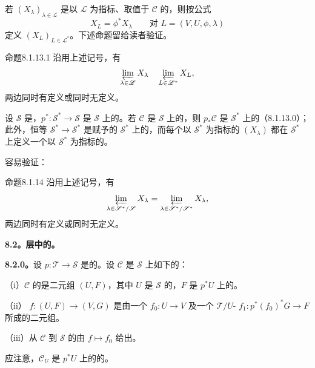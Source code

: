 若 $(X_\lambda)_{\lambda\in\mathscr L}$ 是以 $\mathscr L$ 为指标、取值于 $\mathscr C$ 的，则按公式
\[X_L=\phi^*X_\lambda\qquad\text{对 }L=(V,U,\phi,\lambda)\]
定义 $(X_L)_{L\in\mathscr L^*}$。下述命题留给读者验证。
\begin{SGAresult}{命题}{8.1.13.1}
沿用上述记号，有
\[\varprojlim_{\lambda\in\mathscr L}X_\lambda\quad\varprojlim_{L\in\mathscr L^*}X_L,\]
两边同时有定义或同时无定义。
\end{SGAresult}
设 $\mathscr S$ 是，$p^*:\mathscr S^*\to\mathscr S$ 是 $\mathscr S$ 上的。若 $\mathscr C$ 是 $\mathscr S$ 上的，则 $p_*\mathscr C$ 是 $\mathscr S^*$ 上的（8.1.13.0）；此外，恒等 $\mathscr S^*\to\mathscr S^*$ 是赋予的 $\mathscr S^*$ 上的，而每个以 $\mathscr S^*$ 为指标的 $(X_\lambda)$ 都在 $\mathscr S^*$ 上定义一个以 $\mathscr S^*$ 为指标的。

容易验证：
\begin{SGAresult}{命题}{8.1.14}
沿用上述记号，有
\[\varprojlim_{\lambda\in\mathscr S^*/\mathscr S}X_\lambda=\varprojlim_{\lambda\in\mathscr S^*/\mathscr S^*}X_\lambda,\]
两边同时有定义或同时无定义。
\end{SGAresult}
\textbf{8.2。层中的。}

\textbf{8.2.0。}设 $p:\mathscr T\to\mathscr S$ 是的。设 $\mathscr C$ 是 $\mathscr S$ 上如下的：

（i）$\mathscr C$ 的是二元组 $(U,F)$，其中 $U$ 是 $\mathscr S$ 的，$F$ 是 $p^*U$ 上的。

（ii） $f:(U,F)\to(V,G)$ 是由一个 $f_0:U\to V$ 及一个 $\mathscr T/U$- $f_1:p^*(f_0)^*G\to F$ 所成的二元组。

（iii）从 $\mathscr C$ 到 $\mathscr S$ 的由 $f\mapsto f_0$ 给出。

应注意，$\mathscr C_U$ 是 $p^*U$ 上的的。

